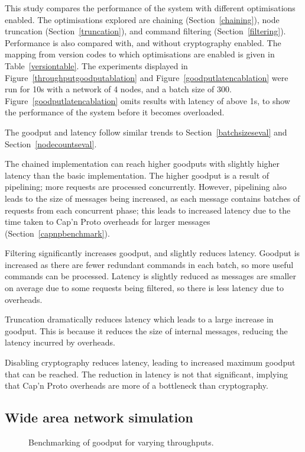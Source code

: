 This study compares the performance of the system with different optimisations enabled. The optimisations explored are chaining (Section~\ref{chaining}), node truncation (Section~\ref{truncation}), and command filtering (Section~\ref{filtering}). Performance is also compared with, and without cryptography enabled. The mapping from version codes to which optimisations are enabled is given in Table~\ref{versiontable}. The experiments displayed in Figure~\ref{throughputgoodputablation} and Figure~\ref{goodputlatencablation} were run for 10s with a network of 4 nodes, and a batch size of 300. Figure~\ref{goodputlatencablation} omits results with latency of above 1s, to show the performance of the system before it becomes overloaded.

The goodput and latency follow similar trends to Section~\ref{batchsizeseval} and Section~\ref{nodecountseval}.

The chained implementation can reach higher goodputs with slightly higher latency than the basic implementation. The higher goodput is a result of pipelining; more requests are processed concurrently. However, pipelining also leads to the size of messages being increased, as each message contains batches of requests from each concurrent phase; this leads to increased latency due to the time taken to Cap'n Proto overheads for larger messages (Section~\ref{capnpbenchmark}).

Filtering significantly increases goodput, and slightly reduces latency. Goodput is increased as there are fewer redundant commands in each batch, so more useful commands can be processed. Latency is slightly reduced as messages are smaller on average due to some requests being filtered, so there is less latency due to overheads.

Truncation dramatically reduces latency which leads to a large increase in goodput. This is because it reduces the size of internal messages, reducing the latency incurred by overheads.

Disabling cryptography reduces latency, leading to increased maximum goodput that can be reached. The reduction in latency is not that significant, implying that Cap'n Proto overheads are more of a bottleneck than cryptography.

\subsection{Wide area network simulation} \label{minineteval}

\begin{figure}[h!]
\centering
\resizebox{.6\textwidth}{!}{}
\caption{Benchmarking of goodput for varying throughputs.}
\label{throughoutgoodputmininet}
\end{figure}

